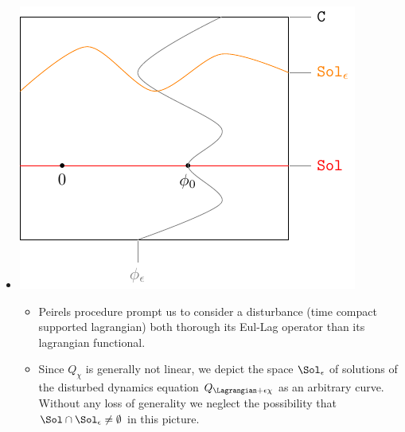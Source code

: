 \documentclass[a4paper,11pt]{scrartcl}
\begin{document}
\begin{itemize}
\item 
		\begin{minipage}{0.4\textwidth}
			\includegraphics[width=\textwidth]{../Pictures/GeometricPicture1}
		\end{minipage}
		\begin{minipage}{0.5\textwidth}
			\begin{itemize}
				\item Peirels procedure prompt us to consider a disturbance (time compact supported lagrangian) both thorough its Eul-Lag operator than its lagrangian functional.
				\item 	Since $Q_\chi$ is generally not linear,
				 we depict the space $\Sol_\epsilon$ of solutions of the disturbed dynamics equation $Q_{\Lagrangian + \epsilon \chi}$ as an arbitrary curve.\\
					Without any loss of generality we  neglect the possibility that $\Sol \cap \Sol_\epsilon \neq \emptyset$ in this picture.
			\end{itemize}
		\end{minipage}
		

\end{itemize}
\end{document}
